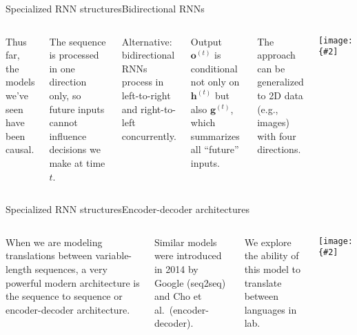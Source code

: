 \documentclass{beamer}
\renewcommand{\vec}[1]{\boldsymbol{#1}}
\newcommand{\myfig}[3]{\centerline{\texttt{[image: \{\#2]}}}
    \centerline{\scriptsize #3}}
\begin{document}
\begin{frame}{Specialized RNN structures}{Bidirectional RNNs}

  \begin{columns}

    \column{2.5in}
    
    Thus far, the models we've seen have been \alert{causal}.

    \medskip

    The sequence is processed in one direction only, so future inputs
    cannot influence decisions we make at time $t$.

    \medskip

    Alternative: \alert{bidirectional RNNs} process in left-to-right
    and right-to-left concurrently.

    \medskip

    Output $\vec{o}^{(t)}$ is conditional not only on $\vec{h}^{(t)}$ but
    also $\vec{g}^{(t)}$, which summarizes all ``future'' inputs.

    \medskip

    The approach can be generalized to 2D data (e.g., images)
    with four directions.

    \column{2in}
    
    \myfig{1.5in}{goodfellow-fig10-11}{Goodfellow et al.\ (2016),
      Fig.\ 10.11}

  \end{columns}
  
\end{frame}


\begin{frame}{Specialized RNN structures}{Encoder-decoder architectures}

  \begin{columns}

    \column{2.4in}
    
    When we are modeling translations between variable-length sequences,
    a very powerful modern architecture is the \alert{sequence to sequence}
    or \alert{encoder-decoder} architecture.

    \medskip

    Similar models were introduced in 2014 by Google (seq2seq) and
    Cho et al.\ (encoder-decoder).

    \medskip

    We explore the ability of this model to translate between languages
    in lab.
    
    \column{2.1in}
    
    \myfig{2in}{goodfellow-fig10-12}{Goodfellow et al.\ (2016), Fig.\ 10.12}

  \end{columns}
  
\end{frame}
\end{document}
